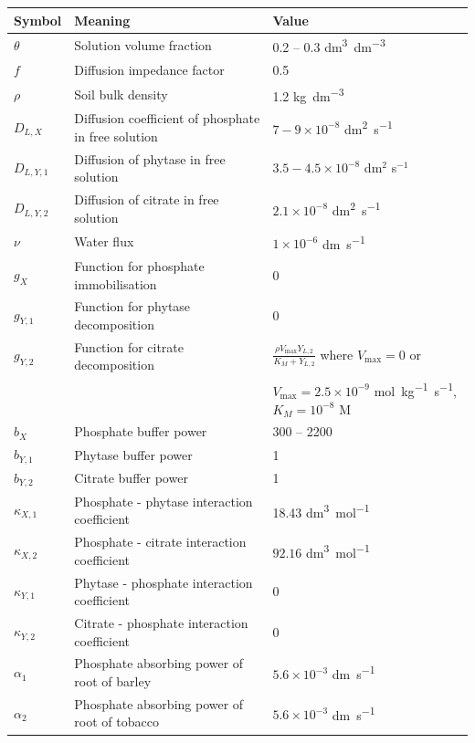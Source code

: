 \documentclass[11pt]{article}
\numberwithin{equation}{section}
\begin{document}
\begin{table}[!htb]
\begin{center}
\fontsize{9.5}{7}\selectfont
\setlength{\tabcolsep}{5.pt}
\def\arraystretch{1.5}
\begin{tabular}{lll}
\toprule
    \bf Symbol & \multicolumn{1}{l}{\bf Meaning} & \bf Value
    \\ \midrule
    $\theta$ & Solution volume fraction & 0.2 -- 0.3 \si{dm^3.dm^{-3}} \\
    $f$ & Diffusion impedance factor & 0.5 \\ 
    $\rho$ & Soil bulk density & 1.2 \si{kg.dm^{-3}} \\
    $D_{L,X} $ & Diffusion coefficient of phosphate in free solution & $7-9 \times 10^{-8}$ \si{dm^2 . s^{-1}} \\  
	$D_{L,Y,1}$ &  Diffusion of phytase in free solution & $3.5 - 4.5 \times 10^{-8}$ dm$^2$ s$^{-1}$ \\   
	$D_{L,Y,2}$ & Diffusion of citrate in free solution & $2.1 \times 10^{-8}$ \si{dm^2 . s^{-1}} \\
	$\nu$ & Water flux & $1 \times 10^{-6}$ \si{dm .s^{-1}}\\
	$g_X$ & Function for phosphate immobilisation & 0 \\
	$g_{Y,1}$ & Function for phytase decomposition & 0 \\
	$g_{Y,2}$ & Function for citrate decomposition & $\frac{\rho V_{\max} Y_{L,2} }{K_M + Y_{L,2} }$ where $V_{\max} = 0$ or \\
	 & & $V_{\max} = 2.5 \times 10^{-9}$ \si{mol.kg^{-1} .s^{-1}}, $K_M=10^{-8}$ \si{M} \\
	$b_X$ & Phosphate buffer power & 300 -- 2200 \\
	$b_{Y,1}$ & Phytase buffer power & 1 \\
	$b_{Y,2}$ & Citrate buffer power & 1 \\
	$\kappa_{X,1}$ & Phosphate - phytase interaction coefficient & 18.43 \si{dm^3 . mol^{-1}} \\
	$\kappa_{X,2}$ & Phosphate - citrate interaction coefficient & $92.16$ \si{dm^3 .mol^{-1}} \\
	$\kappa_{Y,1}$ & Phytase - phosphate interaction coefficient & 0 \\
	$\kappa_{Y,2}$ & Citrate - phosphate interaction coefficient & 0 \\ 
	$\alpha_1 $ & Phosphate absorbing power of root of barley & $5.6 \times 10^{-3}$ \si{dm.s^{-1}} \\
	$\alpha_2 $ & Phosphate absorbing power of root of tobacco & $5.6 \times 10^{-3}$ \si{dm.s^{-1}} \\

\end{tabular}
\end{center}
\end{table}
\end{document}
